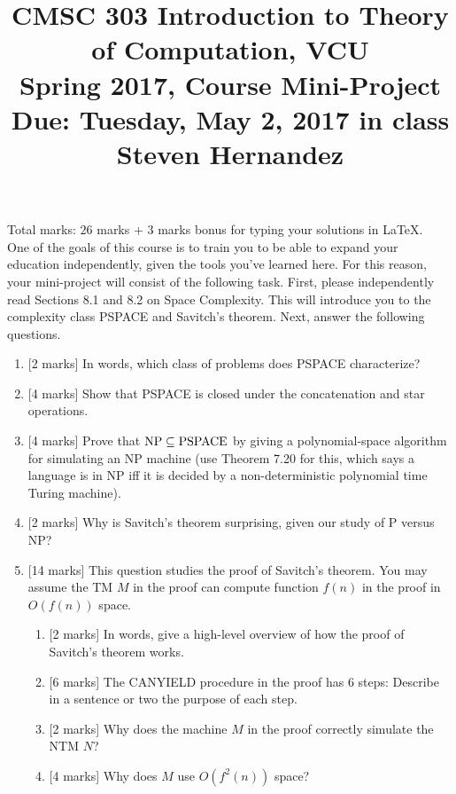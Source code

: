 \documentclass{article}
\begin{document}
\title{CMSC 303 Introduction to Theory of Computation, VCU\\Spring 2017, Course Mini-Project\\Due: Tuesday, May 2, 2017 in class \\ Steven Hernandez}
\date{}
\maketitle
\vspace{-5mm}
\noindent Total marks: $26$ marks + $3$ marks bonus for typing your solutions in LaTeX.\vspace{2mm}\\

One of the goals of this course is to train you to be able to expand your education independently, given the tools you've learned here. For this reason, your mini-project will consist of the following task. First, please independently read Sections 8.1 and 8.2 on Space Complexity. This will introduce you to the complexity class PSPACE and Savitch's theorem. Next, answer the following questions.

\begin{enumerate}
    \item {[2 marks]} In words, which class of problems does PSPACE characterize?
    \item {[4 marks]} Show that PSPACE is closed under the concatenation and star operations.
    \item {[4 marks]} Prove that ${\rm NP}\subseteq {\rm PSPACE}$ by giving a polynomial-space algorithm for simulating an NP machine (use Theorem 7.20 for this, which says a language is in NP iff it is decided by a non-deterministic polynomial time Turing machine).
            \item {[2 marks]} Why is Savitch's theorem surprising, given our study of P versus NP?
            \item {[14 marks]} This question studies the proof of Savitch's theorem. You may assume the TM $M$ in the proof can compute function $f(n)$ in the proof in $O(f(n))$ space.
            \begin{enumerate}
                \item {[2 marks]} In words, give a high-level overview of how the proof of Savitch's theorem works.
                \item {[6 marks]} The CANYIELD procedure in the proof has 6 steps: Describe in a sentence or two the purpose of each step.
                \item {[2 marks]} Why does the machine $M$ in the proof correctly simulate the NTM $N$?
                \item {[4 marks]} Why does $M$ use $O(f^2(n))$ space?
            \end{enumerate}
\end{enumerate}
\end{document}
